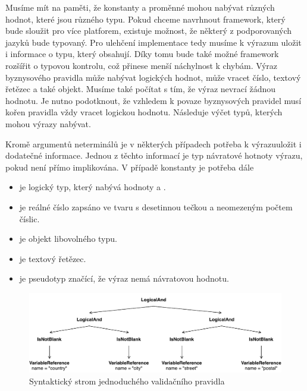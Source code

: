 Musíme mít na paměti, že konstanty a proměnné mohou nabývat různých hodnot, které jsou
různého typu. Pokud chceme navrhnout framework, který bude sloužit pro více platforem,
existuje možnost, že některý z podporovaných jazyků bude typovaný. Pro ulehčení implementace
tedy musíme k výrazum uložit i informace o typu, který obsahují. Díky tomu bude také možné
framework rozšířit o typovou kontrolu, což přinese menší náchylnost k chybám. Výraz byznysového pravidla
může nabývat logických hodnot, může vracet číslo, textový řetězec a také objekt. Musíme také
počítat s tím, že výraz nevrací žádnou hodnotu. Je nutno podotknout, že vzhledem k povaze
byznysových pravidel musí kořen pravidla vždy vracet logickou hodnotu. Následuje výčet typů,
kterých mohou výrazy nabývat.

Kromě argumentů neterminálů je v některých případech potřeba k výrazuuložit i dodatečné informace.
Jednou z těchto informací je typ návratové hotnoty výrazu, pokud není přímo implikována.
V případě konstanty je potřeba dále

\begin{itemize}
    \item {} je logický typ, který nabývá hodnoty  a .
    \item {} je reálné číslo zapsáno ve tvaru s desetinnou tečkou a neomezeným počtem číslic.
    \item {} je objekt libovolného typu.
    \item {} je textový řetězec.
    \item {} je pseudotyp značící, že výraz nemá návratovou hodnotu.
\end{itemize}

\begin{figure}
    \centering
    \includegraphics[keepaspectratio=true, width=1\linewidth]{figures/simple-rule.pdf}
    \caption{Syntaktický strom jednoduchého validačního pravidla}
    \label{fig:simple-rule}
\end{figure}

